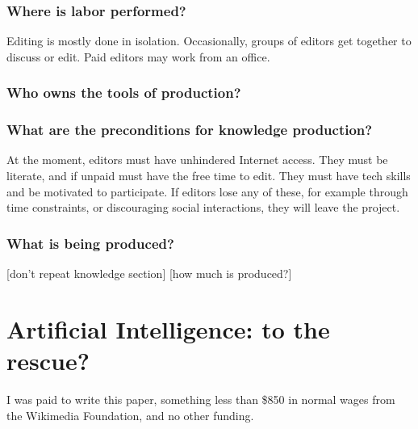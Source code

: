 \subsubsection{Where is labor performed?}

Editing is mostly done in isolation.  Occasionally, groups of editors get together to discuss or edit.  Paid editors may work from an office.

\subsubsection{Who owns the tools of production?}



\subsubsection{What are the preconditions for knowledge production?}

At the moment, editors must have unhindered Internet access.  They must be literate, and if unpaid must have the free time to edit.  They must have tech skills and be motivated to participate.  If editors lose any of these, for example through time constraints, or discouraging social interactions, they will leave the project.

\subsubsection{What is being produced?}

[don't repeat knowledge section]
[how much is produced?]

\section{Artificial Intelligence: to the rescue?}



\begin{acks}
I was paid to write this paper, something less than \$850 in normal wages from the Wikimedia Foundation, and no other funding.
\end{acks}

